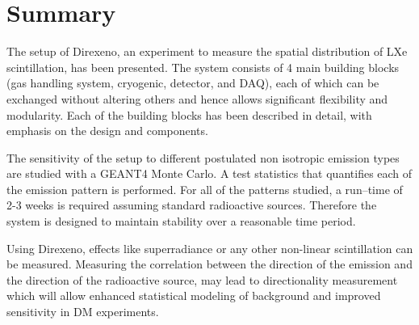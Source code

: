 \section{Summary}
\label{sec:summary}

%
%

The setup of Direxeno, an experiment to measure the spatial distribution of LXe scintillation, has 
been presented. The system consists of 4 main building blocks (gas handling system, cryogenic, detector, 
and DAQ), each of which can be exchanged without altering others and hence allows significant flexibility 
and modularity. Each of the building blocks has been described in detail, with emphasis on the design 
and components.

The sensitivity of the setup to different postulated non isotropic emission types are studied with a 
GEANT4 Monte Carlo. A test statistics that quantifies each of the emission pattern is performed. 
For all of the patterns studied, a run--time of 2-3 weeks is required assuming standard radioactive 
sources. Therefore the system is designed to maintain stability over a reasonable time period.

Using Direxeno, effects like superradiance or any other non-linear scintillation can be measured. 
Measuring the correlation between the direction of the emission and the direction of the radioactive 
source, may lead to directionality measurement which will allow enhanced statistical modeling of 
background and improved sensitivity in DM experiments.
